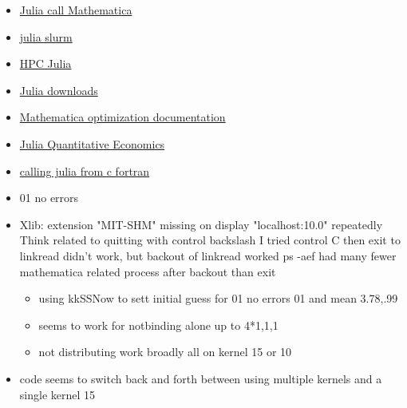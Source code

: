 \documentclass[hyperref]{labbook}
\begin{document}


\begin{itemize}
\item \href{https://github.com/JuliaInterop/Mathematica.jl}{Julia call Mathematica}
\item \href{https://github.com/JuliaParallel/ClusterManagers.jl}{julia slurm}
\item \href{http://ucidatascienceinitiative.github.io/IntroToJulia/Html/HPCJulia}{HPC Julia}
\item \href{http://ucidatascienceinitiative.github.io/IntroToJulia/Html/HPCJulia}{Julia downloads}
\item \href{http://reference.wolfram.com/language/tutorial/ConstrainedOptimizationGlobalNumerical.html}{Mathematica optimization documentation}
\item \href{https://lectures.quantecon.org/jl/getting_started.html}{Julia Quantitative Economics}
\item \href{https://docs.julialang.org/en/stable/manual/embedding/}{calling julia from c fortran}
\end{itemize}


\begin{itemize}
\item 01 no errors
\item Xlib:  extension "MIT-SHM" missing on display "localhost:10.0" repeatedly
Think related to quitting with control backslash  I tried  control C then exit to linkread didn't work, but backout of linkread worked  ps -aef had many fewer mathematica related process after backout than exit
  \begin{itemize}
  \item using kkSSNow to sett initial guess for 01 no errors 01 and mean 3.78,.99
  \item seems to work for notbinding alone up to 4*{1,1,1}
  \item not distributing work broadly all on kernel 15 or 10 
  \end{itemize}

\end{itemize}



\begin{itemize}
\item code seems to switch back and forth between using multiple kernels and a single kernel 15
\end{itemize}
\end{document}
